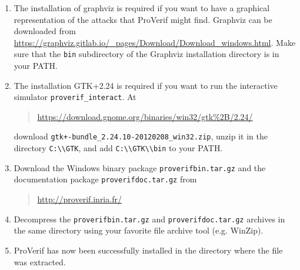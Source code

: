 \documentclass{book}
\begin{document}
\begin{enumerate}
\item The installation of graphviz is required if you want to have a graphical representation of the attacks that ProVerif might find. Graphviz can be downloaded from \url{https://graphviz.gitlab.io/_pages/Download/Download_windows.html}.
Make sure that the \texttt{bin} subdirectory of the Graphviz installation directory is in your PATH.

\sloppy

\item The installation GTK+2.24 is required if you want to run the interactive
simulator \texttt{proverif\_interact}. At
	\begin{quote}
        \url{https://download.gnome.org/binaries/win32/gtk\%2B/2.24/}
	\end{quote}
download \nolinkurl{gtk+-bundle_2.24.10-20120208_win32.zip},
unzip it in the directory \nolinkurl{C:\\GTK}, and add \nolinkurl{C:\\GTK\\bin} to your PATH.

\item Download the Windows binary package \texttt{proverifbin\V.tar.gz} and the documentation
package \texttt{proverifdoc\V.tar.gz}
from
\begin{quote}
	\url{http://proverif.inria.fr/}
\end{quote}

\fussy

	\item Decompress the \texttt{proverifbin\V.tar.gz} and \texttt{proverifdoc\V.tar.gz} archives in the same directory using your favorite file archive tool (e.g. WinZip).

	\item ProVerif has now been successfully installed in the directory where the file was extracted.
\end{enumerate}




\end{document}
